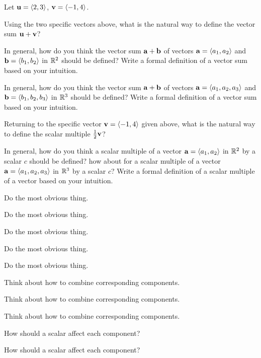 \begin{activity} \label{A:9.2.3}
Let $\mathbf{u} = \langle 2, 3 \rangle$, $\mathbf{v} = \langle -1, 4 \rangle$.
    \ba
    \item Using the two specific vectors above, what is the natural way to define the vector sum $\mathbf{u} + \mathbf{v}$? 

    \item In general, how do you think the vector sum $\mathbf{a} + \mathbf{b}$ of vectors $\mathbf{a} = \langle a_1, a_2 \rangle$ and $\mathbf{b} = \langle b_1, b_2 \rangle$ in $\mathbb{R}^2$ should be defined? Write a formal definition of a vector sum based on your intuition.

    \item In general, how do you think the vector sum $\mathbf{a} + \mathbf{b}$ of vectors $\mathbf{a} = \langle a_1, a_2, a_3 \rangle$ and $\mathbf{b} = \langle b_1, b_2, b_3 \rangle$ in $\mathbb{R}^3$ should be defined? Write a formal definition of a vector sum based on your intuition.

    \item Returning to the specific vector $\mathbf{v} = \langle -1, 4 \rangle$ given above, what is the natural way to define the scalar multiple $\frac{1}{2}\mathbf{v}$? 

    \item In general, how do you think a scalar multiple of a vector $\mathbf{a} = \langle a_1, a_2 \rangle$ in $\mathbb{R}^2$ by a scalar $c$ should be defined? how about for a scalar multiple of a vector $\mathbf{a} = \langle a_1, a_2, a_3 \rangle$ in $\mathbb{R}^3$ by a scalar $c$? Write a formal definition of a scalar multiple of a vector based on your intuition.

    \ea
\end{activity}
\begin{smallhint}
   \ba
    \item Do the most obvious thing.
    \item Do the most obvious thing.
    \item Do the most obvious thing.
    \item Do the most obvious thing.
    \item Do the most obvious thing.
    \ea
\end{smallhint}
\begin{bighint}
	\ba
	\item Think about how to combine corresponding components. 
    \item Think about how to combine corresponding components. 
    \item Think about how to combine corresponding components. 
	\item How should a scalar affect each component?
	\item How should a scalar affect each component?
    \ea
\end{bighint}
